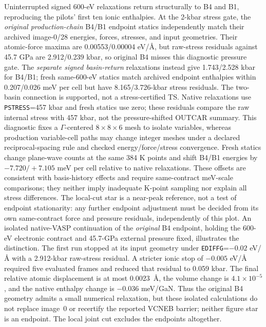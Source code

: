\documentclass[final,5p,times,twocolumn]{elsarticle}
\begin{document}
Uninterrupted signed 600-eV relaxations return structurally to B4 and B1,
reproducing the pilots' first ten ionic enthalpies. At the 2-kbar stress gate,
the \emph{original production-chain} B4/B1 endpoint statics independently
match their archived image-0/28 energies, forces, stresses, and input
geometries. Their atomic-force maxima are 0.00553/0.00004 eV/\AA{}, but
raw-stress residuals against 45.7 GPa are 2.912/0.239 kbar, so original B4
misses this diagnostic pressure gate. The \emph{separate signed basin-return}
relaxations instead give 1.743/2.528 kbar for B4/B1; fresh
same-600-eV statics match archived endpoint enthalpies within 0.207/0.026
meV per cell but have 8.165/3.726-kbar stress residuals. The two-basin
connection is supported, not a stress-certified TS. Native relaxations use
\texttt{PSTRESS}=457 kbar and fresh statics use zero; these residuals compare
the raw internal stress with 457 kbar, not the pressure-shifted OUTCAR summary.
This diagnostic fixes a
$\Gamma$-centered $8\times8\times6$ mesh to isolate variables, whereas
production variable-cell paths may change integer meshes under a declared
reciprocal-spacing rule and checked energy/force/stress convergence. Fresh
statics change plane-wave counts at the same 384 K points and shift B4/B1
energies by $-7.720/+7.105$ meV per cell relative to native relaxations.
These offsets are consistent with basis-history effects and require
same-contract meV-scale comparisons; they neither imply inadequate K-point
sampling nor explain all stress differences.
The local-cut star is a near-peak reference, not a test of endpoint
stationarity: any further endpoint adjustment must be decided from its own
same-contract force and pressure residuals, independently of this plot.
An isolated native-VASP continuation of the \emph{original} B4 endpoint,
holding the 600-eV electronic contract and 45.7-GPa external pressure fixed,
illustrates the distinction. The first run stopped at its input geometry under
\texttt{EDIFFG}=$-0.02$ eV/\AA{} with a 2.912-kbar raw-stress residual. A
stricter ionic stop of $-0.005$ eV/\AA{} required five evaluated frames and
reduced that residual to 0.059 kbar. The final relative atomic displacement is
at most 0.0023~\AA{}, the volume change is $4.1\times10^{-5}$, and the native
enthalpy change is $-0.036$ meV/GaN. Thus the original B4 geometry admits a
small numerical relaxation, but these isolated calculations do not replace
image~0 or recertify the reported VCNEB barrier; neither figure star is an
endpoint. The local joint cut excludes the endpoints altogether.
\end{document}
